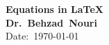\documentclass[12pt,oneside]{article}
\begin{document}
\isCUtitlefalse            %
%


\begin{tcolorbox}
{ \mbox{}
	\begin{singlespace}
	\centering
	\textbf{\large Equations in \LaTeX }\\[6pt]
	\textbf{Dr.~Behzad~Nouri}\\[4pt]
	Date:~\today
	\end{singlespace}
} %
\end{tcolorbox}
\tableofcontents   %

\end{document}

